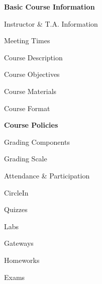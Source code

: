 \documentclass[11pt,letterpaper]{article}
\begin{document}
\mytitle


\begin{minipage}[t]{0.45\textwidth} %
{\bfseries\color{scred} Basic Course Information} \dotfill \pageref{course_info} \par
\hspace{0.3cm} Instructor \& T.A. Information \dotfill \pageref{instr_info} \par
\hspace{0.3cm} Meeting Times \dotfill \pageref{meetings} \par
\hspace{0.3cm} Course Description \dotfill \pageref{course_desc} \par
\hspace{0.3cm} Course Objectives \dotfill \pageref{course_obj} \par
\hspace{0.3cm} Course Materials \dotfill \pageref{course_mat} \par
\hspace{0.3cm} Course Format \dotfill \pageref{course_format} \par
{\bfseries\color{scred} Course Policies} \dotfill \pageref{course_policies} \par
\hspace{0.3cm} Grading Components \dotfill \pageref{grade_comp} \par
\hspace{0.3cm} Grading Scale \dotfill \pageref{grade_scale} \par
\hspace{0.3cm} Attendance \& Participation \dotfill \pageref{attend} \par
\hspace{0.3cm} CircleIn \dotfill \pageref{circlein} \par
\hspace{0.3cm} Quizzes \dotfill \pageref{quiz} \par
\hspace{0.3cm} Labs \dotfill \pageref{labs} \par
\hspace{0.3cm} Gateways \dotfill \pageref{gateways} \par
\hspace{0.3cm} Homeworks \dotfill \pageref{hw} \par
\hspace{0.3cm} Exams \dotfill \pageref{exams} \par

\end{minipage}
\end{document}
